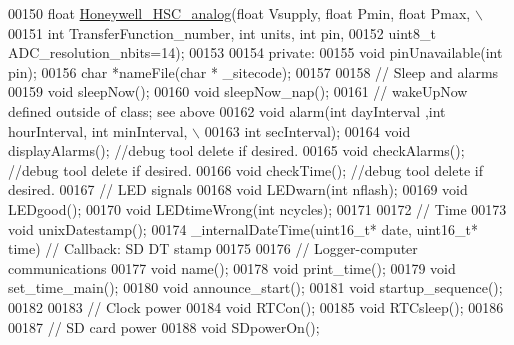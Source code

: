 \begin{DoxyCode}
00150     \textcolor{keywordtype}{float} \hyperlink{classLogger_a71ea885397f448ac03675b1e9a93ecfd}{Honeywell\_HSC\_analog}(\textcolor{keywordtype}{float} Vsupply, \textcolor{keywordtype}{float} Pmin, \textcolor{keywordtype}{float} Pmax, \(\backslash\)
00151           \textcolor{keywordtype}{int} TransferFunction\_number, \textcolor{keywordtype}{int} units, \textcolor{keywordtype}{int} pin,
00152           uint8\_t ADC\_resolution\_nbits=14);
00153 
00154   \textcolor{keyword}{private}:
00155     \textcolor{keywordtype}{void} pinUnavailable(\textcolor{keywordtype}{int} pin);
00156     \textcolor{keywordtype}{char} *nameFile(\textcolor{keywordtype}{char} * \_sitecode);
00157 
00158     \textcolor{comment}{// Sleep and alarms}
00159     \textcolor{keywordtype}{void} sleepNow();
00160     \textcolor{keywordtype}{void} sleepNow\_nap();
00161     \textcolor{comment}{// wakeUpNow defined outside of class; see above}
00162     \textcolor{keywordtype}{void} alarm(\textcolor{keywordtype}{int} dayInterval ,\textcolor{keywordtype}{int} hourInterval, \textcolor{keywordtype}{int} minInterval, \(\backslash\)
00163          \textcolor{keywordtype}{int} secInterval);
00164     \textcolor{keywordtype}{void} displayAlarms(); \textcolor{comment}{//debug tool delete if desired.}
00165     \textcolor{keywordtype}{void} checkAlarms();  \textcolor{comment}{//debug tool delete if desired. }
00166     \textcolor{keywordtype}{void} checkTime();   \textcolor{comment}{//debug tool delete if desired. }
00167     \textcolor{comment}{// LED signals}
00168     \textcolor{keywordtype}{void} LEDwarn(\textcolor{keywordtype}{int} nflash);
00169     \textcolor{keywordtype}{void} LEDgood();
00170     \textcolor{keywordtype}{void} LEDtimeWrong(\textcolor{keywordtype}{int} ncycles);
00171     
00172     \textcolor{comment}{// Time}
00173     \textcolor{keywordtype}{void} unixDatestamp();
00174     \_internalDateTime(uint16\_t* date, uint16\_t* time) \textcolor{comment}{// Callback: SD DT stamp}
00175     
00176     \textcolor{comment}{// Logger-computer communications}
00177     \textcolor{keywordtype}{void} name();
00178     \textcolor{keywordtype}{void} print\_time();
00179     \textcolor{keywordtype}{void} set\_time\_main();
00180     \textcolor{keywordtype}{void} announce\_start();
00181     \textcolor{keywordtype}{void} startup\_sequence();
00182     
00183     \textcolor{comment}{// Clock power}
00184     \textcolor{keywordtype}{void} RTCon();
00185     \textcolor{keywordtype}{void} RTCsleep();
00186     
00187     \textcolor{comment}{// SD card power}
00188     \textcolor{keywordtype}{void} SDpowerOn();

\end{DoxyCode}
